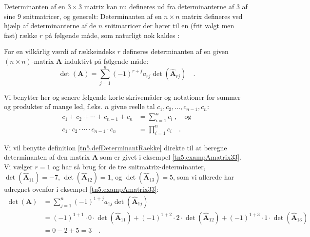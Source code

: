 Determinanten af en $3 \times 3$ matrix kan nu defineres ud fra determinanterne af $3$ af sine $9$ snitmatricer, og generelt: Determinanten af en $n \times n$ matrix defineres ved hjælp af determinanterne af de $n$ snitmatricer der hører til en (frit valgt men fast) række $r$
på følgende måde, som naturligt nok kaldes :

\begin{definition}\label{tn5.defDeterminantRaekke}
For en vilkårlig værdi af rækkeindeks $r$ defineres determinanten af
en given $(n \times n)$-matrix $\mathbf{A}$ induktivt på følgende måde:
\begin{equation} \label{tn5.eqDeterminant}
\det(\mathbf{A}) = \sum_{j=1}^{n}(-1)^{r+j}a_{rj}\det(\widehat{\mathbf{A}}_{rj})\quad .
\end{equation}
\end{definition}

\begin{info}
Vi benytter her og senere følgende korte skrivemåder og notationer for summer og produkter
af mange led, f.eks. $n$ givne reelle tal $c_{1}, c_{2}, \ldots, c_{n-1}, c_{n}$:
\begin{equation}
\begin{aligned}
c_{1}+ c_{2} + \cdots + c_{n-1} + c_{n} &= \sum_{i=1}^{n} c_{i} \; , \quad \textrm{og}\\
c_{1} \cdot c_{2} \cdot \cdots \cdot c_{n-1} \cdot c_{n} &= \prod_{i=1}^{n} c_{i} \quad .
\end{aligned}
\end{equation}
\end{info}

\begin{example} \label{tn5.detAf3x3matrix}
Vi vil benytte definition \ref{tn5.defDeterminantRaekke} direkte til at beregne determinanten af den matrix $\mathbf{A}$ som er givet i eksempel \ref{tn5.exampAmatrix33}. Vi vælger $r=1$ og har så brug for de tre snitmatrix-determinanter, $\det(\widehat{\mathbf{A}}_{11}) = -7$, $\det(\widehat{\mathbf{A}}_{12}) = 1$, og $\det(\widehat{\mathbf{A}}_{13})= 5$, som vi allerede har udregnet ovenfor i eksempel \ref{tn5.exampAmatrix33}:
\begin{equation}
\begin{aligned}
\det(\mathbf{A}) &=  \sum_{j=1}^{n}(-1)^{1+j}a_{1j}\det(\widehat{\mathbf{A}}_{1j}) \\
&= (-1)^{1+1}\cdot 0 \cdot\det(\widehat{\mathbf{A}}_{11}) + (-1)^{1+2}\cdot2\cdot\det(\widehat{\mathbf{A}}_{12}) +
(-1)^{1+3} \cdot 1 \cdot \det(\widehat{\mathbf{A}}_{13}) \\
&= 0 - 2 + 5 = 3 \quad .
\end{aligned}
\end{equation}
\end{example}

